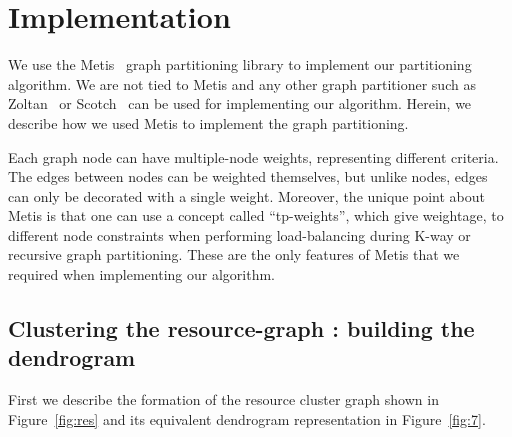 \section{Implementation}
\label{sec:imple}

We use the Metis~\cite{gkar95} graph partitioning library to implement
our partitioning algorithm. We are not tied to Metis and any other graph
partitioner such as Zoltan~\cite{kdev09} or Scotch~\cite{cche08} can be
used for implementing our algorithm. Herein, we describe how we used
Metis to implement the graph partitioning.

Each graph node can have multiple-node weights, representing different
criteria. The edges between nodes can be weighted themselves, but unlike
nodes, edges can only be decorated with a single weight. Moreover, the
unique point about Metis is that one can use a concept called
``tp-weights'', which give weightage, to different node constraints when
performing load-balancing during K-way or recursive graph
partitioning. These are the only features of Metis that we required when
implementing our algorithm. %

\subsection{Clustering the resource-graph : building the dendrogram}
\label{sec:clust-reso-graph}

First we describe the formation of the resource cluster graph shown in
Figure~\ref{fig:res} and its equivalent dendrogram representation in
Figure~\ref{fig:7}.

